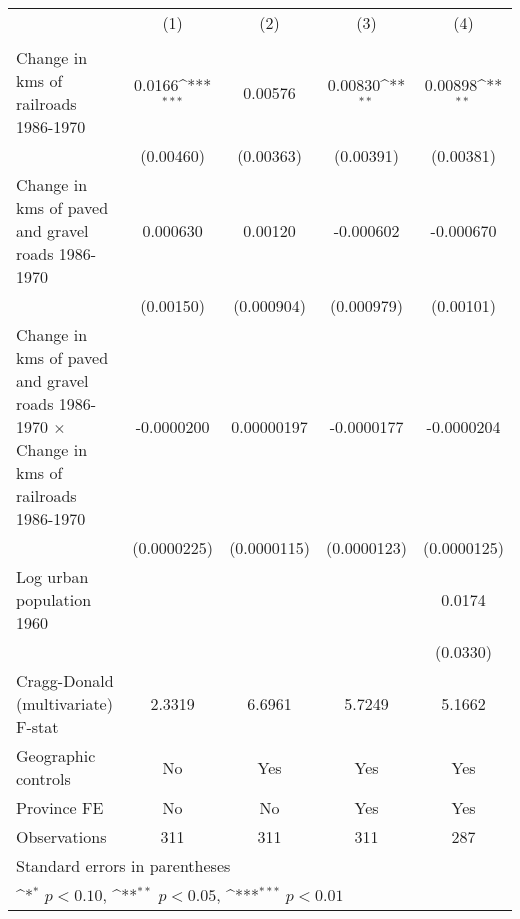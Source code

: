 {
\def\sym#1{\ifmmode^{#1}\else\(^{#1}\)\fi}
\begin{tabular}{l*{4}{c}}
\hline\hline
                &\multicolumn{1}{c}{(1)}&\multicolumn{1}{c}{(2)}&\multicolumn{1}{c}{(3)}&\multicolumn{1}{c}{(4)}\\
                &\multicolumn{1}{c}{}&\multicolumn{1}{c}{}&\multicolumn{1}{c}{}&\multicolumn{1}{c}{}\\
\hline
Change in kms of railroads 1986-1970&   0.0166\sym{***}&  0.00576         &  0.00830\sym{**} &  0.00898\sym{**} \\
                &(0.00460)         &(0.00363)         &(0.00391)         &(0.00381)         \\
[1em]
Change in kms of paved and gravel roads 1986-1970& 0.000630         &  0.00120         &-0.000602         &-0.000670         \\
                &(0.00150)         &(0.000904)         &(0.000979)         &(0.00101)         \\
[1em]
Change in kms of paved and gravel roads 1986-1970 $\times$ Change in kms of railroads 1986-1970&-0.0000200         &0.00000197         &-0.0000177         &-0.0000204         \\
                &(0.0000225)         &(0.0000115)         &(0.0000123)         &(0.0000125)         \\
[1em]
Log urban population 1960&                  &                  &                  &   0.0174         \\
                &                  &                  &                  & (0.0330)         \\
\hline
Cragg-Donald (multivariate) F-stat&   2.3319         &   6.6961         &   5.7249         &   5.1662         \\
Geographic controls&       No         &      Yes         &      Yes         &      Yes         \\
Province FE     &       No         &       No         &      Yes         &      Yes         \\
Observations    &      311         &      311         &      311         &      287         \\
\hline\hline
\multicolumn{5}{l}{\footnotesize Standard errors in parentheses}\\
\multicolumn{5}{l}{\footnotesize \sym{*} \(p<0.10\), \sym{**} \(p<0.05\), \sym{***} \(p<0.01\)}\\
\end{tabular}
}
